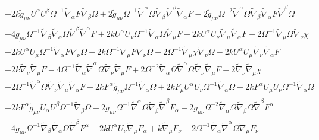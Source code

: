 \documentclass[10pt,letterpaper]{article}
\numberwithin{equation}{section}
\begin{document}
\begin{eqnarray}
&& + 2 k \tilde{g}_{\mu \nu } U^{\alpha } U^{\beta } \Omega^{-1} \tilde{\nabla}_{\alpha }F \tilde{\nabla}_{\beta }\Omega + 2 \tilde{g}_{\mu \nu } \Omega^{-1} \tilde{\nabla}^{\alpha }\Omega \tilde{\nabla}_{\beta }\tilde{\nabla}^{\beta }\tilde{\nabla}_{\alpha }F - 2 \tilde{g}_{\mu \nu } \Omega^{-2} \tilde{\nabla}^{\alpha }\Omega \tilde{\nabla}_{\beta }\tilde{\nabla}_{\alpha }F \tilde{\nabla}^{\beta }\Omega \nonumber \\ 
&& + 4 \tilde{g}_{\mu \nu } \Omega^{-1} \tilde{\nabla}_{\beta }\tilde{\nabla}_{\alpha }\Omega \tilde{\nabla}^{\beta }\tilde{\nabla}^{\alpha }F + 2 k U^{\alpha } U_{\nu } \Omega^{-1} \tilde{\nabla}_{\alpha }\Omega \tilde{\nabla}_{\mu }F - 2 k U^{\alpha } U_{\nu } \tilde{\nabla}_{\mu }\tilde{\nabla}_{\alpha }F + 2 \Omega^{-1} \tilde{\nabla}_{\mu }\Omega \tilde{\nabla}_{\nu }\chi \nonumber \\ 
&& + 2 k U^{\alpha } U_{\mu } \Omega^{-1} \tilde{\nabla}_{\alpha }F \tilde{\nabla}_{\nu }\Omega + 2 k \Omega^{-1} \tilde{\nabla}_{\mu }F \tilde{\nabla}_{\nu }\Omega + 2 \Omega^{-1} \tilde{\nabla}_{\mu }\chi \tilde{\nabla}_{\nu }\Omega - 2 k U^{\alpha } U_{\mu } \tilde{\nabla}_{\nu }\tilde{\nabla}_{\alpha }F \nonumber \\ 
&& + 2 k \tilde{\nabla}_{\nu }\tilde{\nabla}_{\mu }F - 4 \Omega^{-1} \tilde{\nabla}_{\alpha }\tilde{\nabla}^{\alpha }\Omega \tilde{\nabla}_{\nu }\tilde{\nabla}_{\mu }F + 2 \Omega^{-2} \tilde{\nabla}_{\alpha }\Omega \tilde{\nabla}^{\alpha }\Omega \tilde{\nabla}_{\nu }\tilde{\nabla}_{\mu }F - 2 \tilde{\nabla}_{\nu }\tilde{\nabla}_{\mu }\chi \nonumber \\ 
&& - 2 \Omega^{-1} \tilde{\nabla}^{\alpha }\Omega \tilde{\nabla}_{\nu }\tilde{\nabla}_{\mu }\tilde{\nabla}_{\alpha }F+2 k F^{\alpha } \tilde{g}_{\mu \nu } \Omega^{-1} \tilde{\nabla}_{\alpha }\Omega + 2 k F_{\mu } U^{\alpha } U_{\nu } \Omega^{-1} \tilde{\nabla}_{\alpha }\Omega - 2 k F^{\alpha } U_{\mu } U_{\nu } \Omega^{-1} \tilde{\nabla}_{\alpha }\Omega \nonumber \\ 
&& + 2 k F^{\alpha } \tilde{g}_{\mu \nu } U_{\alpha } U^{\beta } \Omega^{-1} \tilde{\nabla}_{\beta }\Omega + 2 \tilde{g}_{\mu \nu } \Omega^{-1} \tilde{\nabla}^{\alpha }\Omega \tilde{\nabla}_{\beta }\tilde{\nabla}^{\beta }F_{\alpha } - 2 \tilde{g}_{\mu \nu } \Omega^{-2} \tilde{\nabla}_{\alpha }\Omega \tilde{\nabla}_{\beta }\Omega \tilde{\nabla}^{\beta }F^{\alpha } \nonumber \\ 
&& + 4 \tilde{g}_{\mu \nu } \Omega^{-1} \tilde{\nabla}_{\beta }\tilde{\nabla}_{\alpha }\Omega \tilde{\nabla}^{\beta }F^{\alpha } - 2 k U^{\alpha } U_{\nu } \tilde{\nabla}_{\mu }F_{\alpha } + k \tilde{\nabla}_{\mu }F_{\nu } - 2 \Omega^{-1} \tilde{\nabla}_{\alpha }\tilde{\nabla}^{\alpha }\Omega \tilde{\nabla}_{\mu }F_{\nu } \nonumber \\ 

\end{eqnarray}
\end{document}
